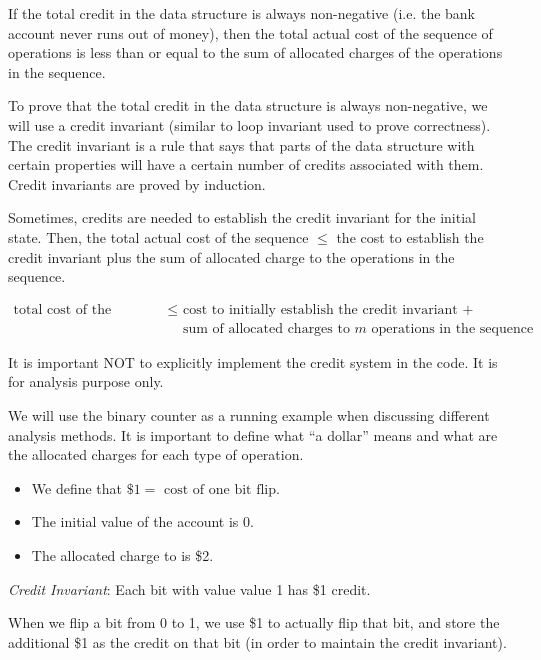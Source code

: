 If the total credit in the data structure is always non-negative (i.e. the bank account never runs out of money), then the total actual cost of the sequence of operations is less than or equal to the sum of allocated charges of the operations in the sequence.

To prove that the total credit in the data structure is always non-negative, we will use a credit invariant (similar to loop invariant used to prove correctness). The credit invariant is a rule that says that parts of the data structure with certain properties will have a certain number of credits associated with them. Credit invariants are proved by induction.

Sometimes, credits are needed to establish the credit invariant for the initial state. Then, the total actual cost of the sequence $\leq$ the cost to establish the credit invariant plus the sum of allocated charge to the operations in the sequence.

$$
\begin{aligned}
    \text{total cost of the sequence} \leq & \text{ cost to initially establish the credit invariant } + \\
    & \text{ sum of allocated charges to $m$ operations in the sequence}
\end{aligned}
$$

\begin{remark}
    It is important NOT to explicitly implement the credit system in the code. It is for analysis purpose only.
\end{remark}

We will use the binary counter as a running example when discussing different analysis methods. It is important to define what ``a dollar'' means and what are the allocated charges for each type of operation.

\begin{itemize}
    \item We define that $\$1 = \text{ cost of one bit flip}$.
    \item The initial value of the account is 0. 
    \item The allocated charge to  is \$2.
\end{itemize}

\textit{Credit Invariant}: Each bit with value value 1 has \$1 credit.

When we flip a bit from 0 to 1, we use \$1 to actually flip that bit, and store the additional \$1 as the credit on that bit (in order to maintain the credit invariant).

